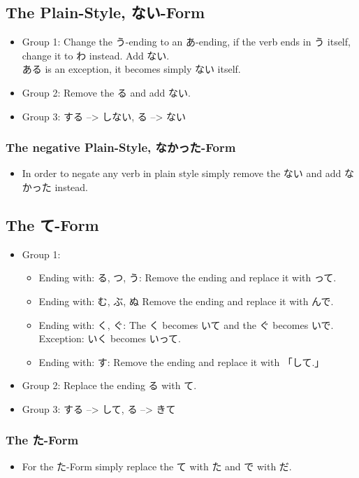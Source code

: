 \documentclass{article}
\newcommand\tab[1][1cm]{\hspace*{#1}}
\newcommand\tabyon[1][0.4cm]{\hspace*{#1}}
\begin{document}
\subsection{The Plain-Style, ない-Form }
\begin{itemize}
\item Group 1: Change the う-ending to an あ-ending, if the verb ends in う itself, 
change it to わ instead.
Add ない. \\ \tab ある is an exception, it becomes simply ない itself.
\item Group 2: Remove the る and add ない. 
\item Group 3: する --> しない, \tabyon {}る --> ない
\end{itemize}
\subsubsection{The negative Plain-Style, なかった-Form}
\begin{itemize}
\item In order to negate any verb in plain style simply remove the ない and add なかった instead.
\end{itemize}
\subsection{The て-Form}
\begin{itemize} \item Group 1:
\begin{itemize} \item Ending with: る, つ, う: Remove the ending and replace it with って.
\item Ending with: む, ぶ, ぬ Remove the ending and replace it with んで.
\item Ending with: く, ぐ: The く becomes いて and the ぐ becomes いで. Exception: いく becomes いって.
\item Ending with: す: Remove the ending and replace it with 「して.」
\end{itemize}
\item Group 2: Replace the ending る with て.
\item Group 3: する --> して, \tabyon {}る --> きて
\end{itemize}
\subsubsection{The た-Form}
\begin{itemize}
\item For the た-Form simply replace the て with た and で with だ.
\end{itemize}
\end{document}
